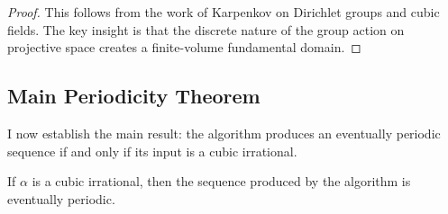 \begin{proof}
This follows from the work of Karpenkov \cite{Karpenkov2022} on Dirichlet groups and cubic fields. The key insight is that the discrete nature of the group action on projective space creates a finite-volume fundamental domain.
\end{proof}

\subsection{Main Periodicity Theorem}

I now establish the main result: the \HAPD{} algorithm produces an eventually periodic sequence if and only if its input is a cubic irrational.

\begin{theorem}\label{thm:cubic_periodic}
If $\alpha$ is a cubic irrational, then the sequence produced by the \HAPD{} algorithm is eventually periodic.
\end{theorem}

